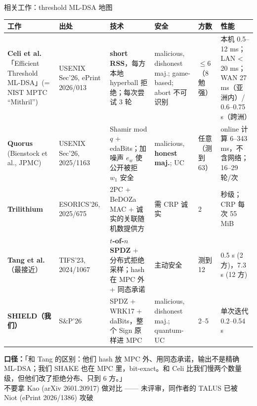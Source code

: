 \documentclass[aspectratio=169,10pt,fontset=none]{ctexbeamer}
\newcommand{\say}[1]{{\color{ok}\textbf{口径：}}#1}
\newcommand{\src}[1]{{\scriptsize\color{gray}#1}}
\begin{document}
\begin{frame}{相关工作：threshold ML-DSA 地图}
{\scriptsize
\renewcommand{\arraystretch}{1.15}
\begin{tabularx}{\textwidth}{@{}p{2.9cm}p{1.6cm}Y p{2.3cm}p{1.1cm}Y@{}}
\toprule
\textbf{工作} & \textbf{出处} & \textbf{技术} & \textbf{安全} & \textbf{方数} & \textbf{性能} \\\midrule
\textbf{Celi et al.}「Efficient Threshold ML-DSA」(= NIST MPTC ``Mithril'') & USENIX Sec'26, ePrint 2026/013 & \textbf{short RSS}，每方本地 hyperball 拒绝；每次尝试 3 轮 & malicious, dishonest maj.; game-based; abort 不可识别 & $\le 6$（8 勉强）& 本机 0.5--12 ms；LAN < 20 ms；WAN 27 ms（亚洲内）/ 0.6--0.75 s（跨洲）\\
\textbf{Quorus} (Bienstock et al., JPMC) & USENIX Sec'26, 2025/1163 & Shamir mod $q$ + edaBits；加噪声 $e_w$ 使公开被拒 $w_1$ 安全 & malicious, \textbf{honest maj.}; UC & 任意（测到 63）& online 计算 6--343 ms，不含网络；16--29 轮/次 \\
\textbf{Trilithium} & ESORICS'26, 2025/675 & 2PC + BeDOZa MAC + 诚实的关联随机数提供方 & 需 CRP 诚实 & 2 & 秒级；CRP 每次 55 MiB \\
\textbf{Tang et al.} \alert{（最接近）} & TIFS'23, 2024/1067 & \textbf{$t$-of-$n$ SPDZ} + 分布式拒绝采样；hash 在 MPC 外 + 同态承诺 & 主动安全 & 测到 12 & 0.5 s (2 方)，7.3 s (12 方) \\
\textbf{SHIELD（我们）} & S\&P'26 & SPDZ + WRK17 + daBits，整个 Sign 原样进 MPC & malicious, dishonest maj.; quantum-UC & 2--5 & 单次迭代 0.2--0.54 s \\
\bottomrule
\end{tabularx}}
\vspace{.3em}

\say{「和 Tang 的区别：他们 hash 放 MPC 外、用同态承诺，输出不是精确 ML-DSA；我们 SHAKE 也在 MPC 里，bit-exact。和 Celi 比我们慢两个数量级，但他们改了拒绝分布、只到 6 方。」}\\
\src{不要拿 Kao (arXiv 2601.20917) 做对比 —— 未评审，同作者的 TALUS 已被 Niot (ePrint 2026/1386) 攻破}
\end{frame}
\end{document}

